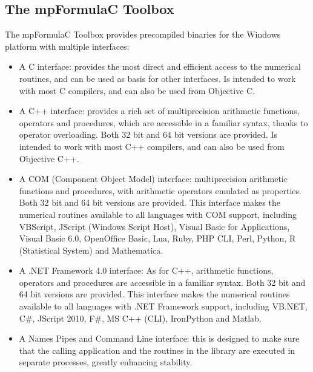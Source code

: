 \subsection{The mpFormulaC Toolbox}	
The mpFormulaC Toolbox provides precompiled binaries for the Windows platform with multiple interfaces:

\begin{itemize}	
	
	\item A C interface: provides the most direct and efficient access to the numerical routines, and can be used as basis for other interfaces. Is intended to work with most C compilers, and can also be used from Objective C.
	\item A C++ interface: provides a rich set of multiprecision arithmetic functions, operators and procedures, which are accessible in a familiar syntax, thanks to operator overloading. Both 32 bit and 64 bit versions are provided. Is intended to work with most C++ compilers, and can also be used from Objective C++.
	\item A COM (Component Object Model) interface: multiprecision arithmetic functions and procedures, with arithmetic operators emulated as properties. Both 32 bit and 64 bit versions are provided. This interface makes the numerical routines available to all languages with COM support, including VBScript, JScript (Windows Script Host), Visual Basic for Applications, Visual Basic 6.0, OpenOffice  Basic, Lua, Ruby, PHP CLI, Perl, Python, R (Statistical System) and Mathematica.
	\item A .NET Framework 4.0 interface: As for C++, arithmetic functions, operators and procedures are accessible in a familiar syntax. Both 32 bit and 64 bit versions are provided. This interface makes the numerical routines available to all languages with .NET Framework support, including VB.NET, C\#, JScript 2010, F\#, MS C++ (CLI), IronPython and Matlab.
	\item A Names Pipes and Command Line interface: this is designed to make sure that the calling application and the routines in the library are executed in separate processes, greatly enhancing stability. 
	
\end{itemize}




